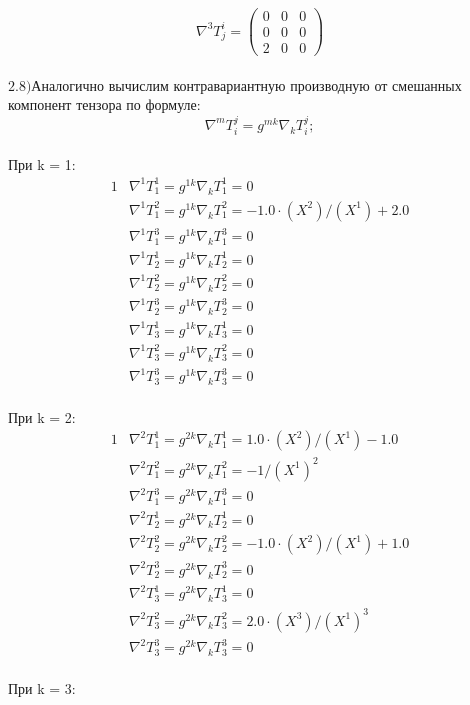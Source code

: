 \documentclass{article}
\begin{document}
\[
\nabla^3T^i_j = \begin{pmatrix}
	0 & 0 & 0\\
	0 & 0 & 0\\
	2 & 0 & 0
\end{pmatrix}
\]\\
$\mathrm{2.8) }$Аналогично вычислим контравариантную производную от смешанных компонент тензора по формуле:\\
\[
\nabla^mT^j_i = g^{mk}\nabla_kT^j_i;
\]\\
При k = 1:\\
\begin{alignat*}{1}
  & \nabla^1T^1_1 = g^{1k}\nabla_kT^1_1 = 0 \\
  & \nabla^1T^2_1 = g^{1k}\nabla_kT^2_1 = -1.0\cdot (X^2)/(X^1) + 2.0 \\
  & \nabla^1T^3_1 = g^{1k}\nabla_kT^3_1 = 0 \\
  & \nabla^1T^1_2 = g^{1k}\nabla_kT^1_2 = 0 \\
  & \nabla^1T^2_2 = g^{1k}\nabla_kT^2_2 = 0 \\
  & \nabla^1T^3_2 = g^{1k}\nabla_kT^3_2 = 0 \\
  & \nabla^1T^1_3 = g^{1k}\nabla_kT^1_3 = 0 \\
  & \nabla^1T^2_3 = g^{1k}\nabla_kT^2_3 = 0 \\
  & \nabla^1T^3_3 = g^{1k}\nabla_kT^3_3 = 0 
\end{alignat*}\\
При k = 2:\\
\begin{alignat*}{1}
  & \nabla^2T^1_1 = g^{2k}\nabla_kT^1_1 = 1.0\cdot (X^2)/(X^1) - 1.0 \\
  & \nabla^2T^2_1 = g^{2k}\nabla_kT^2_1 = -1/(X^1)^2 \\
  & \nabla^2T^3_1 = g^{2k}\nabla_kT^3_1 = 0 \\
  & \nabla^2T^1_2 = g^{2k}\nabla_kT^1_2 = 0 \\
  & \nabla^2T^2_2 = g^{2k}\nabla_kT^2_2 = -1.0\cdot (X^2)/(X^1) + 1.0 \\
  & \nabla^2T^3_2 = g^{2k}\nabla_kT^3_2 = 0 \\
  & \nabla^2T^1_3 = g^{2k}\nabla_kT^1_3 = 0 \\
  & \nabla^2T^2_3 = g^{2k}\nabla_kT^2_3 = 2.0\cdot (X^3)/(X^1)^3 \\
  & \nabla^2T^3_3 = g^{2k}\nabla_kT^3_3 = 0 
\end{alignat*}\\
При k = 3:\\
\end{document}
